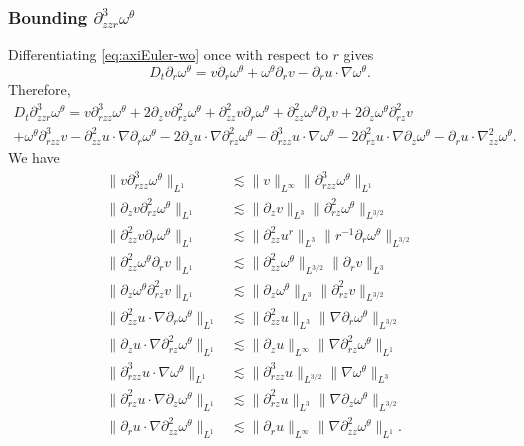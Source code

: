 \documentclass[11pt]{amsart}
\numberwithin{equation}{section}
\def\d{\partial}
\begin{document}
\subsubsection*{Bounding   $\d^3_{zzr}\omega^\theta$} 
Differentiating  \eqref{eq:axiEuler-wo} once with respect to $r$ gives
\begin{equation}\label{eq:axiEuler-wo1}
D_t\d_r\omega^\theta= v\d_r\omega^\theta+\omega^\theta\d_r v-\d_ru\cdot\nabla\omega^\theta .
\end{equation}
Therefore, 
\begin{multline*}
D_t \d^3_{zzr}\omega^\theta= v\d^3_{rzz}\omega^\theta+2\d_zv\d^2_{rz}\omega^\theta+\d^2_{zz}v\d_r\omega^\theta
+\d^2_{zz}\omega^\theta\d_r v  
+2\d_z\omega^\theta\d^2_{rz} v  \\+\omega^\theta\d^3_{rzz} v  
- \d^2_{zz}u\cdot\nabla\d_r\omega^\theta-2\d_zu\cdot\nabla\d^2_{rz}\omega^\theta-\d^3_{rzz}u\cdot\nabla\omega^\theta
-2\d^2_{rz}u\cdot\nabla \d_z\omega^\theta-\d_r u\cdot\nabla^2_{zz}\omega^\theta.
\end{multline*}
We have
\begin{align*}
\|v\d^3_{rzz}\omega^\theta\|_{L^1}&\lesssim\|v\|_{L^\infty}\|\d^3_{rzz}\omega^\theta\|_{L^1} \\
\|\d_zv\d^2_{rz}\omega^\theta\|_{L^1}&\lesssim \|{\d_zv}\|_{L^3}\|\d^2_{rz}\omega^\theta\|_{L^{3/2}} \\
\|\d^2_{zz}v\d_r\omega^\theta\|_{L^1}&\lesssim\|\d^2_{zz}u^r\|_{L^3}\|r^{-1}\d_r\omega^\theta\|_{L^{3/2}} \\
\|\d^2_{zz}\omega^\theta\d_r v \|_{L^1}&\lesssim\|\d^2_{zz}\omega^\theta\|_{L^{3/2}}\|\d_r v \|_{L^3}\\ 
\|\d_z\omega^\theta\d^2_{rz} v \|_{L^1}&\lesssim  \|\d_z\omega^\theta\|_{L^3}\|\d^2_{rz} v \|_{L^{3/2}}\\ 
\|\d^2_{zz}u\cdot\nabla\d_r\omega^\theta\|_{L^1}&\lesssim\|\d^2_{zz}u\|_{L^3}\|\nabla\d_r\omega^\theta\|_{L^{3/2}} \\
\|\d_zu\cdot\nabla\d^2_{rz}\omega^\theta\|_{L^1}&\lesssim \|\d_zu\|_{L^\infty}\|\nabla\d^2_{rz}\omega^\theta\|_{L^1}\\
\|\d^3_{rzz}u\cdot\nabla\omega^\theta\|_{L^1}&\lesssim \|\d^3_{rzz}u\|_{L^{3/2}}\|\nabla\omega^\theta\|_{L^3}\\
\|\d^2_{rz}u\cdot\nabla \d_z\omega^\theta\|_{L^1}&\lesssim \|\d^2_{rz}u\|_{L^3}\|\nabla \d_z\omega^\theta\|_{L^{3/2}} \\
\|\d_r u\cdot\nabla\d^2_{zz}\omega^\theta\|_{L^1}&\lesssim \|\d_r u\|_{L^\infty}\|\nabla\d^2_{zz}\omega^\theta\|_{L^1}.
\end{align*}
\end{document}
